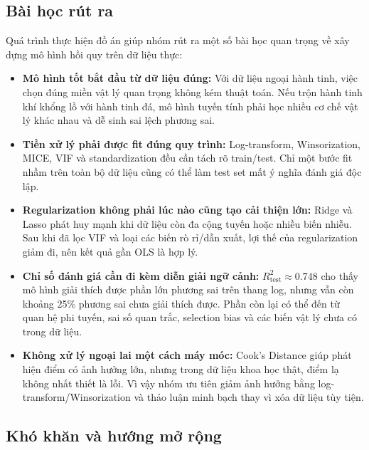 \subsection{Bài học rút ra}

Quá trình thực hiện đồ án giúp nhóm rút ra một số bài học quan trọng về xây dựng mô hình hồi quy
trên dữ liệu thực:

\begin{itemize}[itemsep=0.15cm]
    \item \textbf{Mô hình tốt bắt đầu từ dữ liệu đúng:} Với dữ liệu ngoại hành tinh, việc chọn
          đúng miền vật lý quan trọng không kém thuật toán. Nếu trộn hành tinh khí khổng lồ với
          hành tinh đá, mô hình tuyến tính phải học nhiều cơ chế vật lý khác nhau và dễ sinh sai
          lệch phương sai.

    \item \textbf{Tiền xử lý phải được fit đúng quy trình:} Log-transform, Winsorization, MICE,
          VIF và standardization đều cần tách rõ train/test. Chỉ một bước fit nhầm trên toàn bộ
          dữ liệu cũng có thể làm test set mất ý nghĩa đánh giá độc lập.

    \item \textbf{Regularization không phải lúc nào cũng tạo cải thiện lớn:} Ridge và Lasso phát
          huy mạnh khi dữ liệu còn đa cộng tuyến hoặc nhiều biến nhiễu. Sau khi đã lọc VIF và
          loại các biến rò rỉ/dẫn xuất, lợi thế của regularization giảm đi, nên kết quả gần OLS
          là hợp lý.

    \item \textbf{Chỉ số đánh giá cần đi kèm diễn giải ngữ cảnh:} $R^2_{\mathrm{test}}\approx
          0.748$ cho thấy mô hình giải thích được phần lớn phương sai trên thang log, nhưng vẫn
          còn khoảng 25\% phương sai chưa giải thích được. Phần còn lại có thể đến từ quan hệ
          phi tuyến, sai số quan trắc, selection bias và các biến vật lý chưa có trong dữ liệu.

    \item \textbf{Không xử lý ngoại lai một cách máy móc:} Cook's Distance giúp phát hiện điểm có
          ảnh hưởng lớn, nhưng trong dữ liệu khoa học thật, điểm lạ không nhất thiết là lỗi. Vì
          vậy nhóm ưu tiên giảm ảnh hưởng bằng log-transform/Winsorization và thảo luận minh bạch
          thay vì xóa dữ liệu tùy tiện.
\end{itemize}

\subsection{Khó khăn và hướng mở rộng}

